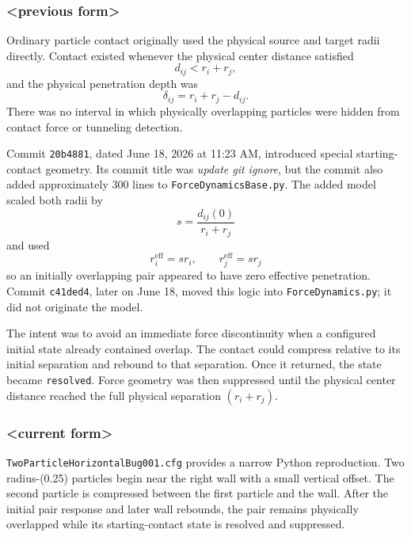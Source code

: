 \subsubsection{<previous form>}

Ordinary particle contact originally used the physical source and target
radii directly.  Contact existed whenever the physical center distance
satisfied
\begin{equation}
d_{ij}<r_i+r_j,
\end{equation}
and the physical penetration depth was
\begin{equation}
\delta_{ij}=r_i+r_j-d_{ij}.
\end{equation}
There was no interval in which physically overlapping particles were hidden
from contact force or tunneling detection.

Commit \texttt{20b4881}, dated June 18, 2026 at 11:23 AM, introduced special
starting-contact geometry.  Its commit title was \emph{update git ignore}, but
the commit also added approximately 300 lines to
\texttt{ForceDynamicsBase.py}.  The added model scaled both radii by
\begin{equation}
s=\frac{d_{ij}(0)}{r_i+r_j}
\end{equation}
and used
\begin{equation}
r_i^{\mathrm{eff}}=s r_i,
\qquad
r_j^{\mathrm{eff}}=s r_j
\end{equation}
so an initially overlapping pair appeared to have zero effective
penetration.  Commit \texttt{c41ded4}, later on June 18, moved this logic into
\texttt{ForceDynamics.py}; it did not originate the model.

The intent was to avoid an immediate force discontinuity when a configured
initial state already contained overlap.  The contact could compress relative
to its initial separation and rebound to that separation.  Once it returned,
the state became \texttt{resolved}.  Force geometry was then suppressed until
the physical center distance reached the full physical separation
$(r_i+r_j)$.

\subsubsection{<current form>}

\texttt{TwoParticleHorizontalBug001.cfg} provides a narrow Python
reproduction.  Two radius-(0.25) particles begin near the right wall with a
small vertical offset.  The second particle is compressed between the first
particle and the wall.  After the initial pair response and later wall
rebounds, the pair remains physically overlapped while its starting-contact
state is resolved and suppressed.

